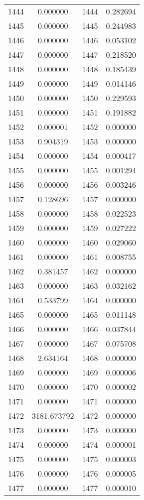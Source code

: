 \documentclass[12pt]{article}
\begin{document}
\begin{longtable}{@{}cccc@{}}
1444 & 0.000000 & 1444 & 0.282694 \\
1445 & 0.000000 & 1445 & 0.244983 \\
1446 & 0.000000 & 1446 & 0.053102 \\
1447 & 0.000000 & 1447 & 0.218520 \\
1448 & 0.000000 & 1448 & 0.185439 \\
1449 & 0.000000 & 1449 & 0.014146 \\
1450 & 0.000000 & 1450 & 0.229593 \\
1451 & 0.000000 & 1451 & 0.191882 \\
1452 & 0.000001 & 1452 & 0.000000 \\
1453 & 0.904319 & 1453 & 0.000000 \\
1454 & 0.000000 & 1454 & 0.000417 \\
1455 & 0.000000 & 1455 & 0.001294 \\
1456 & 0.000000 & 1456 & 0.003246 \\
1457 & 0.128696 & 1457 & 0.000000 \\
1458 & 0.000000 & 1458 & 0.022523 \\
1459 & 0.000000 & 1459 & 0.027222 \\
1460 & 0.000000 & 1460 & 0.029060 \\
1461 & 0.000000 & 1461 & 0.008755 \\
1462 & 0.381457 & 1462 & 0.000000 \\
1463 & 0.000000 & 1463 & 0.032162 \\
1464 & 0.533799 & 1464 & 0.000000 \\
1465 & 0.000000 & 1465 & 0.011148 \\
1466 & 0.000000 & 1466 & 0.037844 \\
1467 & 0.000000 & 1467 & 0.075708 \\
1468 & 2.634164 & 1468 & 0.000000 \\
1469 & 0.000000 & 1469 & 0.000006 \\
1470 & 0.000000 & 1470 & 0.000002 \\
1471 & 0.000000 & 1471 & 0.000000 \\
1472 & 3181.673792 & 1472 & 0.000000 \\
1473 & 0.000000 & 1473 & 0.000000 \\
1474 & 0.000000 & 1474 & 0.000001 \\
1475 & 0.000000 & 1475 & 0.000003 \\
1476 & 0.000000 & 1476 & 0.000005 \\
1477 & 0.000000 & 1477 & 0.000010 \\

\end{longtable}
\end{document}
